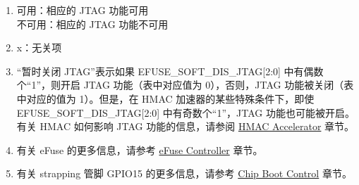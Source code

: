 \begin{tiplisting}
\vspace{-2em}
\begin{enumerate}
\item \label{JTAG footnote: 1}
    可用：相应的 JTAG 功能可用\\
    不可用：相应的 JTAG 功能不可用
\item \label{JTAG footnote: 2}
    x：无关项
\item \label{JTAG footnote: 3}
    “暂时关闭 JTAG”表示如果 EFUSE\_SOFT\_DIS\_JTAG[2:0] 中有偶数个“1”，则开启 JTAG 功能（表中对应值为 0），否则，JTAG 功能被关闭（表中对应的值为 1）。但是，在\chipname{} HMAC 加速器的某些特殊条件下，即使 EFUSE\_SOFT\_DIS\_JTAG[2:0] 中有奇数个“1”，JTAG 功能也可能被开启。
    有关 HMAC 如何影响 JTAG 功能的信息，请参阅 \hyperref[mod:hmac]{HMAC Accelerator} 章节。
\item \label{JTAG footnote: 4}
    有关 eFuse 的更多信息，请参考 \hyperref[mod:efuse]{eFuse Controller} 章节。
\item \label{JTAG footnote: 5}
    有关 strapping 管脚 GPIO15 的更多信息，请参考 \hyperref[mod:bootctrl]{Chip Boot Control} 章节。
\end{enumerate}
\end{tiplisting}